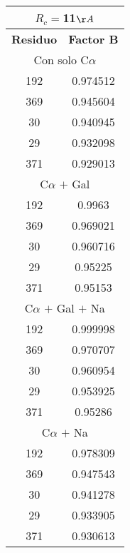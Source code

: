 \begin{tabular}[c]{|c|c|}
\multicolumn{2}{c}{$R_c=$11$\AA$}\\\hline
\textbf{Residuo}&\textbf{Factor B}\\\hline
\multicolumn{2}{c}{Con solo C$\alpha$}\\\hline
       192&  0.974512\\
       369&  0.945604\\
        30&  0.940945\\
        29&  0.932098\\
       371&  0.929013\\
\hline
\multicolumn{2}{c}{C$\alpha$ $+$ Gal}\\\hline
       192&    0.9963\\
       369&  0.969021\\
        30&  0.960716\\
        29&   0.95225\\
       371&   0.95153\\
\hline
\multicolumn{2}{c}{C$\alpha$ $+$ Gal $+$ Na}\\\hline
       192&  0.999998\\
       369&  0.970707\\
        30&  0.960954\\
        29&  0.953925\\
       371&   0.95286\\
\hline
\multicolumn{2}{c}{C$\alpha$ $+$ Na}\\\hline
       192&  0.978309\\
       369&  0.947543\\
        30&  0.941278\\
        29&  0.933905\\
       371&  0.930613\\
\hline
\end{tabular}
